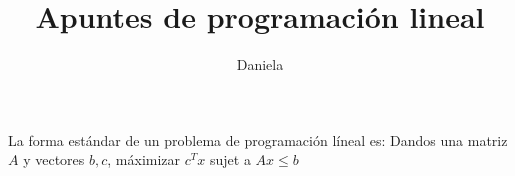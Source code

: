 \documentclass{article}
\title{Apuntes de programación lineal}
\author{Daniela}
\begin{document}
\maketitle
La forma estándar de un problema de programación líneal es:
Dandos una matriz $A$ y vectores $b,c$, máximizar $c^Tx$ sujet a $Ax\leq b$ 
\end{document}
